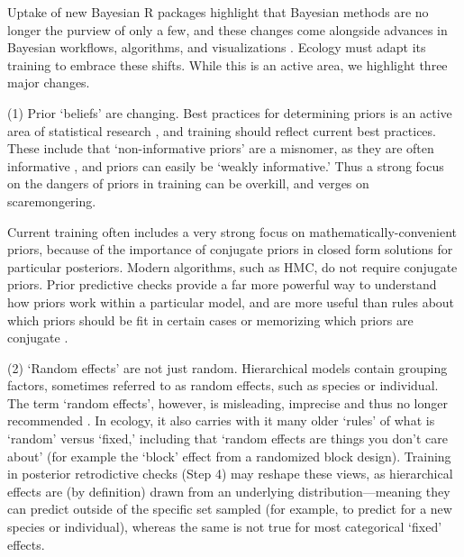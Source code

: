 \documentclass[11pt]{article}
\begin{document}
Uptake of new Bayesian \textsf{R} packages highlight that Bayesian methods are no longer the purview of only a few, and these changes come alongside advances in Bayesian workflows, algorithms, and visualizations \citep[e.g.][]{betanworkflow,vandeschoot2021,gabryvis}. Ecology must adapt its training to embrace these shifts. While this is an active area, we highlight three major changes.

(1) Prior `beliefs' are changing. Best practices for determining priors is an active area of statistical research \citep{BDA,regotherstories,betanprior}, and training should reflect current best practices. These include that `non-informative priors' are a misnomer, as they are often informative  \citep{lemoine2019}, and priors can easily be `weakly informative.' Thus a strong focus on the dangers of priors in training can be overkill, and verges on scaremongering. 

Current training often includes a very strong focus on mathematically-convenient priors, because of the importance of conjugate priors in closed form solutions for particular posteriors. Modern algorithms, such as HMC, do not require conjugate priors. Prior predictive checks provide a far more powerful way to understand how priors work within a particular model, and are more useful than rules about which priors should be fit in certain cases or memorizing which priors are conjugate \citep{betanprior}. %

(2) `Random effects' are not just random. Hierarchical models contain grouping factors, sometimes referred to as random effects, such as species or individual. The term `random effects', however, is misleading, imprecise and thus no longer recommended \citep{gelmanhill}. In ecology, it also carries with it many older `rules' of what is `random' versus `fixed,' including that `random effects are things you don't care about' (for example the `block' effect from a randomized block design). Training in posterior retrodictive checks (Step 4) may reshape these views, as hierarchical effects are (by definition) drawn from an underlying distribution---meaning they can predict outside of the specific set  sampled (for example, to predict for a new species or individual), whereas the same is not true for most categorical `fixed' effects.
\end{document}
